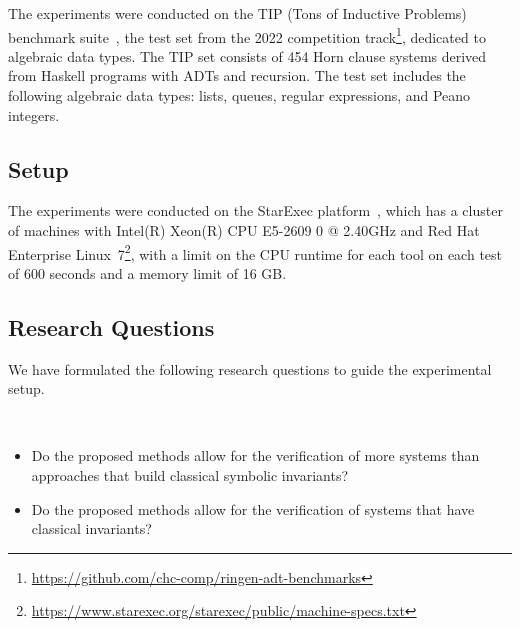 The experiments were conducted on the TIP (Tons of Inductive Problems) benchmark suite~\cite{claessen2015tip}, the test set from the 2022 \chccomp{} competition track\footnote{\url{https://github.com/chc-comp/ringen-adt-benchmarks}}, dedicated to algebraic data types. The TIP set consists of 454 Horn clause systems derived from Haskell programs with ADTs and recursion. The test set includes the following algebraic data types: lists, queues, regular expressions, and Peano integers.

\subsection{Setup}
The experiments were conducted on the StarExec platform~\cite{stump2014starexec}, which has a cluster of machines with Intel(R) Xeon(R) CPU E5-2609 0 @ 2.40GHz and Red Hat Enterprise Linux~7\footnote{\url{https://www.starexec.org/starexec/public/machine-specs.txt}}, with a limit on the CPU runtime for each tool on each test of 600 seconds and a memory limit of 16 GB.

\subsection{Research Questions}

We have formulated the following research questions to guide the experimental setup.
\begin{resquest}\label{rq:conv}
$ $

\begin{itemize}
    \item Do the proposed methods allow for the verification of more systems than approaches that build classical symbolic invariants?
    \item Do the proposed methods allow for the verification of systems that have classical invariants?

\end{itemize}
\end{resquest}

